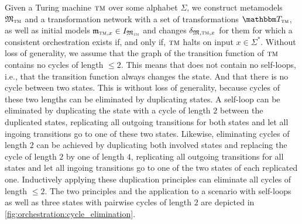Given a Turing machine $\textsc{tm}$ over some alphabet $\Sigma$, we construct metamodels $\mathfrak{M}_{\textsc{tm}}$ and a transformation network with a set of transformations $\transformationset{T}_{\TuringMachine}$, as well as initial models $\mathfrak{m}_{\textsc{tm}, x} \in I_{\mathfrak{M_{\textsc{tm}}}}$ and changes $\mathfrak{\delta}_{\mathfrak{M},\textsc{tm},x}$ for them for which a consistent orchestration exists if, and only if, $\textsc{tm}$ halts on input $x \in \Sigma^*$.
Without loss of generality, we assume that the graph of the transition function of $\textsc{tm}$ contains no cycles of length $\leq 2$.
This means that does not contain no self-loops, i.e., that the transition function always changes the state.
And that there is no cycle between two states.
This is without loss of generality, because cycles of these two lengths can be eliminated by duplicating states.
A self-loop can be eliminated by duplicating the state with a cycle of length $2$ between the duplicated states,  replicating all outgoing transitions for both states and let all ingoing transitions go to one of these two states.
Likewise, eliminating cycles of length $2$ can be achieved by duplicating both involved states and replacing the cycle of length $2$ by one of length $4$, replicating all outgoing transitions for all states and let all ingoing transitions go to one of the two states of each replicated one.
Inductively applying these duplication principles can eliminate all cycles of length $\leq 2$.
The two principles and the application to a scenario with self-loops as well as three states with pairwise cycles of length $2$ are depicted in \autoref{fig:orchestration:cycle_elimination}.

